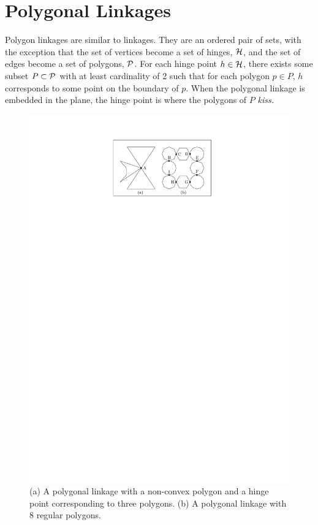 \section{Polygonal Linkages}
Polygon linkages are similar to linkages.  They are an ordered pair of sets, with the exception 
that the set of vertices become a set of hinges, ${\cal H}$, and the set of edges become a set of 
polygons, ${\cal P}$.  For each hinge point $h \in {\cal H}$, there exists some subset $P \subset {\cal P}$ with 
at least cardinality of 2 such that for each polygon $p \in P$, $h$ corresponds to some point on 
the boundary of $p$.  When the polygonal linkage is embedded in the plane, the hinge point is where 
the polygons of $P$ \it{kiss}.  
\begin{figure}[h]
\begin{center}
\includegraphics[scale=1]{graphics/PolygonalLinkageExamples.pdf}
\end{center} 
\caption{(a) A polygonal linkage with a non-convex polygon and a hinge point corresponding to three 
polygons.  (b) A polygonal linkage with 8 regular polygons.}
\label{fig:linkage-2}
\end{figure}
